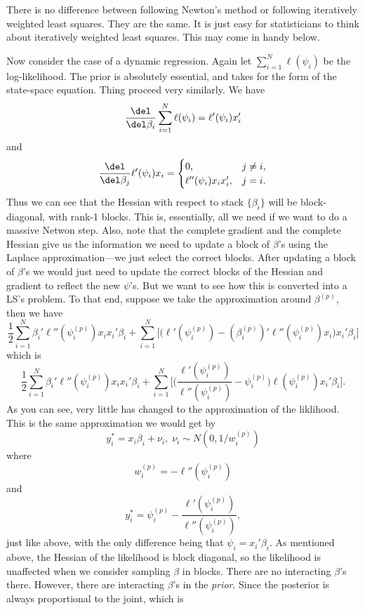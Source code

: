 \documentclass{article}
\begin{document}
There is no difference between following Newton's method or following
iteratively weighted least squares.  They are the same.  It is just easy for
statisticians to think about iteratively weighted least squares.  This may come
in handy below.

Now consider the case of a dynamic regression.  Again let $\sum_{i=1}^N
\ell(\psi_i)$ be the log-likelihood.  The prior is absolutely essential, and
takes for the form of the state-space equation.  Thing proceed very similarly.
We have
\[
\frac{\del}{\del \beta_i} \sum_{i=1}^N \ell(\psi_i)
= \ell'(\psi_i) x_i'
\]
and
\[
\frac{\del}{\del \beta_j} \ell'(\psi_i) x_i = 
\begin{cases}
0, & j \neq i , \\
\ell''(\psi_i) x_i x_i' , & j = i.
\end{cases}
\]
Thus we can see that the Hessian with respect to stack $\{\beta_i\}$ will be
block-diagonal, with rank-1 blocks.  This is, essentially, all we need if we
want to do a massive Netwon step.  Also, note that the complete gradient and the
complete Hessian give us the information we need to update a block of $\beta$'s
using the Laplace approximation---we just select the correct blocks.  After
updating a block of $\beta$'s we would just need to update the correct blocks of
the Hessian and gradient to reflect the new $\psi$'s.  But we want to see how
this is converted into a LS's problem.  To that end, suppose we take the
approximation around $\beta^{(p)}$, then we have
\[
\frac{1}{2} \sum_{i=1}^N \beta_i' \ell''(\psi_i^{(p)}) x_i x_i' \beta_i
+ \sum_{i=1}^N \Big[ \Big( \ell'(\psi_i^{(p)}) - (\beta_i^{(p)})' \ell''(\psi_i^{(p)})
x_i \Big) x_i' \beta_i \Big]
\]
which is
\[
\frac{1}{2} \sum_{i=1}^N \beta_i' \ell''(\psi_i^{(p)}) x_i x_i' \beta_i
+ \sum_{i=1}^N \Big[ \Big( \frac{\ell'(\psi_i^{(p)})}{\ell''(\psi_i^{(p)})} -
\psi_i^{(p)}\Big)  \ell(\psi_i^{(p)})  x_i' \beta_i \Big].
\]
As you can see, very little has changed to the approximation of the liklihood.
This is the same approximation we would get by
\[
y_i^* = x_i \beta_i + \nu_i, \; \nu_i \sim N(0, 1/w_i^{(p)})
\]
where
\[
w^{(p)}_i = -\ell''(\psi_i^{(p)})
\]
and
\[
y_i^* = \psi_i^{(p)} - \frac{\ell'(\psi_i^{(p)})}{\ell''(\psi_i^{(p)})},
\]
just like above, with the only difference being that $\psi_i = x_i' \beta_i$.
As mentioned above, the Hessian of the likelihood is block diagonal, so the
likelihood is unaffected when we consider sampling $\beta$ in blocks.  There are
no interacting $\beta$'s there.  However, there are interacting $\beta$'s in the
\emph{prior}.  Since the posterior is always proportional to the joint, which is
\end{document}
